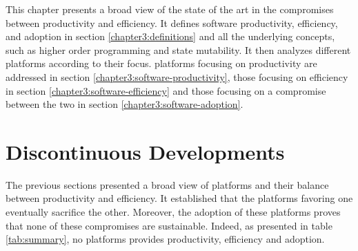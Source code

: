 This chapter presents a broad view of the state of the art in the compromises between productivity and efficiency.
It defines software productivity, efficiency, and adoption in section \ref{chapter3:definitions} and all the underlying concepts, such as higher order programming and state mutability.
It then analyzes different platforms according to their focus. platforms focusing on productivity are addressed in section \ref{chapter3:software-productivity}, those focusing on efficiency in section \ref{chapter3:software-efficiency} and those focusing on a compromise between the two in section \ref{chapter3:software-adoption}.







\section{Discontinuous Developments}



The previous sections presented a broad view of platforms and their balance between productivity and efficiency.
It established that the platforms favoring one eventually sacrifice the other.
Moreover, the adoption of these platforms proves that none of these compromises are sustainable.
Indeed, as presented in table \ref{tab:summary}, no platforms provides productivity, efficiency and adoption.


\separator

